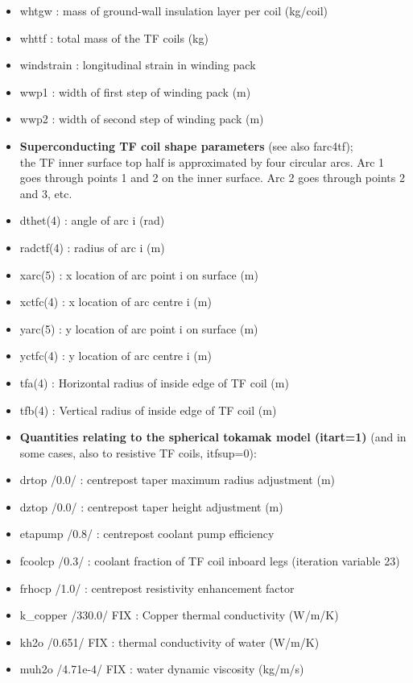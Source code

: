 \documentclass[]{article}
\begin{document}
\begin{itemize}
\item
  whtgw : mass of ground-wall insulation layer per coil (kg/coil)
\item
  whttf : total mass of the TF coils (kg)
\item
  windstrain : longitudinal strain in winding pack
\item
  wwp1 : width of first step of winding pack (m)
\item
  wwp2 : width of second step of winding pack (m)
\item
  \textbf{Superconducting TF coil shape parameters} (see also
  farc4tf);\\
  the TF inner surface top half is approximated by four circular arcs.
  Arc 1 goes through points 1 and 2 on the inner surface. Arc 2 goes
  through points 2 and 3, etc.
\item
  dthet(4) : angle of arc i (rad)
\item
  radctf(4) : radius of arc i (m)
\item
  xarc(5) : x location of arc point i on surface (m)
\item
  xctfc(4) : x location of arc centre i (m)
\item
  yarc(5) : y location of arc point i on surface (m)
\item
  yctfc(4) : y location of arc centre i (m)
\item
  tfa(4) : Horizontal radius of inside edge of TF coil (m)
\item
  tfb(4) : Vertical radius of inside edge of TF coil (m)
\item
  \textbf{Quantities relating to the spherical tokamak model (itart=1)}
  (and in some cases, also to resistive TF coils, itfsup=0):
\item
  drtop /0.0/ : centrepost taper maximum radius adjustment (m)
\item
  dztop /0.0/ : centrepost taper height adjustment (m)
\item
  etapump /0.8/ : centrepost coolant pump efficiency
\item
  fcoolcp /0.3/ : coolant fraction of TF coil inboard legs (iteration
  variable 23)
\item
  frhocp /1.0/ : centrepost resistivity enhancement factor
\item
  k\_copper /330.0/ FIX : Copper thermal conductivity (W/m/K)
\item
  kh2o /0.651/ FIX : thermal conductivity of water (W/m/K)
\item
  muh2o /4.71e-4/ FIX : water dynamic viscosity (kg/m/s)

\end{itemize}
\end{document}

